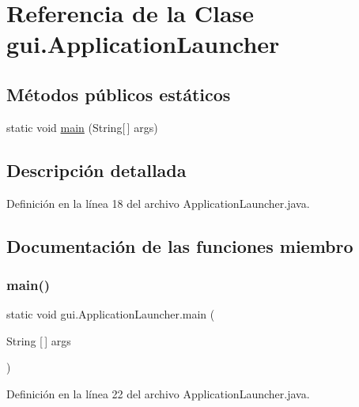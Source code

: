 \hypertarget{classgui_1_1_application_launcher}{}\section{Referencia de la Clase gui.\+Application\+Launcher}
\label{classgui_1_1_application_launcher}
\subsection*{Métodos públicos estáticos}
\begin{DoxyCompactItemize}
\item 
static void \mbox{\hyperlink{classgui_1_1_application_launcher_a4d18ca6d7262e81ed5e5746dae2de30a}{main}} (String\mbox{[}$\,$\mbox{]} args)
\end{DoxyCompactItemize}


\subsection{Descripción detallada}


Definición en la línea 18 del archivo Application\+Launcher.\+java.



\subsection{Documentación de las funciones miembro}
\mbox{\label{classgui_1_1_application_launcher_a4d18ca6d7262e81ed5e5746dae2de30a}} 
\subsubsection{\texorpdfstring{main()}{main()}}
{\footnotesize\ttfamily static void gui.\+Application\+Launcher.\+main (\begin{DoxyParamCaption}\item[{String \mbox{[}$\,$\mbox{]}}]{args }\end{DoxyParamCaption})\hspace{0.3cm}{\ttfamily [static]}}



Definición en la línea 22 del archivo Application\+Launcher.\+java.


